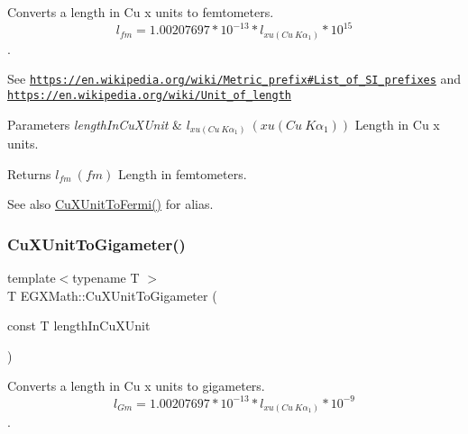 Converts a length in Cu x units to femtometers. \[ l_{fm}=1.00207697*10^{-13} * l_{xu(Cu\ K\alpha_1)} * 10^{15} \]. 

See \href{https://en.wikipedia.org/wiki/Metric_prefix#List_of_SI_prefixes}{\tt https\+://en.\+wikipedia.\+org/wiki/\+Metric\+\_\+prefix\#\+List\+\_\+of\+\_\+\+S\+I\+\_\+prefixes} and \href{https://en.wikipedia.org/wiki/Unit_of_length}{\tt https\+://en.\+wikipedia.\+org/wiki/\+Unit\+\_\+of\+\_\+length} 
\begin{DoxyParams}{Parameters}
{\em length\+In\+Cu\+X\+Unit} & $ l_{xu(Cu\ K\alpha_1)}\ (xu(Cu\ K\alpha_1))$ Length in Cu x units. \\
\hline
\end{DoxyParams}
\begin{DoxyReturn}{Returns}
$ l_{fm}\ (fm)$ Length in femtometers. 
\end{DoxyReturn}
\begin{DoxySeeAlso}{See also}
\mbox{\hyperlink{group___e_g_x_math-_conversions-_length_conversions-_non-_s_i-_cu_x_unit-_non-_s_i_ga14c8dd2723d4482371d1ec42465f417f}{Cu\+X\+Unit\+To\+Fermi()}} for alias. 
\end{DoxySeeAlso}
\mbox{\label{group___e_g_x_math-_conversions-_length_conversions-_non-_s_i-_cu_x_unit-_s_i_ga0b99d0bc9eb9a673d2eba2fa595a1866}} 
\subsubsection{\texorpdfstring{Cu\+X\+Unit\+To\+Gigameter()}{CuXUnitToGigameter()}}
{\footnotesize\ttfamily template$<$typename T $>$ \\
T E\+G\+X\+Math\+::\+Cu\+X\+Unit\+To\+Gigameter (\begin{DoxyParamCaption}\item[{const T}]{length\+In\+Cu\+X\+Unit }\end{DoxyParamCaption})}



Converts a length in Cu x units to gigameters. \[ l_{Gm}=1.00207697*10^{-13} * l_{xu(Cu\ K\alpha_1)} * 10^{-9} \]. 

